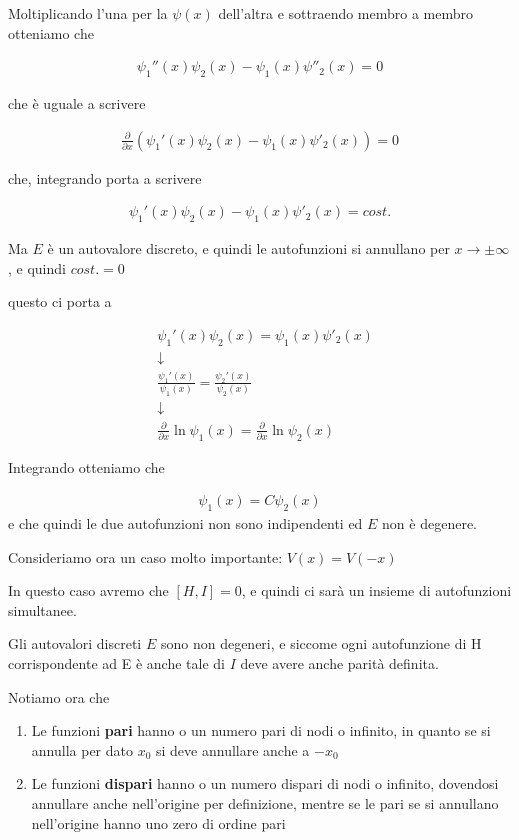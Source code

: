 Moltiplicando l'una per la $\psi(x)$ dell'altra e sottraendo membro a membro otteniamo che 

\begin{align}
\psi_1''(x)\psi_2(x) - \psi_1(x)\psi''_2(x)=0
\end{align}

che è uguale a scrivere

\begin{align}
\frac{\partial}{\partial x}(\psi_1'(x)\psi_2(x) - \psi_1(x)\psi'_2(x))=0
\end{align}

che, integrando porta a scrivere

\begin{align}
\psi_1'(x)\psi_2(x) - \psi_1(x)\psi'_2(x)= cost.
\end{align}

Ma $E$ è un autovalore discreto, e quindi le autofunzioni si annullano per $x \rightarrow \pm \infty$, e quindi $cost.=0$

questo ci porta a

\begin{align}
{}&\psi_1'(x)\psi_2(x) = \psi_1(x)\psi'_2(x) \\
&\downarrow \nonumber \\
&\frac{\psi_1'(x)}{\psi_1(x)}=\frac{\psi_2'(x)}{\psi_2(x)}\\
&\downarrow \nonumber \\
& \frac{\partial}{\partial x} \ln{\psi_1(x)} =  \frac{\partial}{\partial x}\ln{\psi_2(x)}
\end{align}

Integrando otteniamo che

\begin{align}
\psi_1(x) = C \psi_2(x)
\end{align}
e che quindi le due autofunzioni non sono indipendenti ed $E$ non è degenere.

Consideriamo ora un caso molto importante: $V(x)=V(-x)$

In questo caso avremo che $[H,I]=0$, e quindi ci sarà un insieme di autofunzioni simultanee.

Gli autovalori discreti $E$ sono non degeneri, e siccome ogni autofunzione di H corrispondente ad E è anche tale di $I$ deve avere anche parità definita.

Notiamo ora che

\begin{enumerate}
	\item Le funzioni \textbf{pari} hanno o un numero pari di nodi o infinito, in quanto se si annulla per dato $x_0$ si deve annullare anche a $-x_0$
	\item Le funzioni \textbf{dispari} hanno o un numero dispari di nodi o infinito, dovendosi annullare anche nell'origine per definizione, mentre se le pari se si annullano nell'origine hanno uno zero di ordine pari
\end{enumerate}

